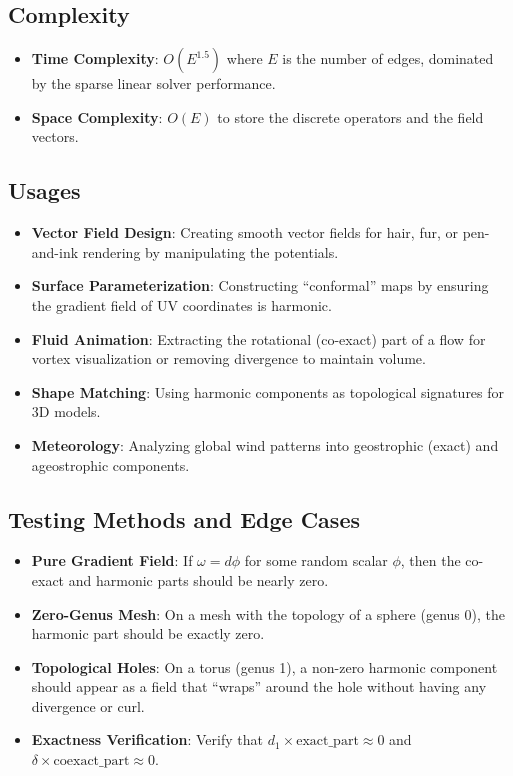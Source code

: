 \subsection{Complexity}
\begin{itemize}
    \item \textbf{Time Complexity}: $O(E^{1.5})$ where $E$ is the number of edges, dominated by the sparse linear solver performance.
    \item \textbf{Space Complexity}: $O(E)$ to store the discrete operators and the field vectors.
\end{itemize}

\subsection{Usages}
\begin{itemize}
    \item \textbf{Vector Field Design}: Creating smooth vector fields for hair, fur, or pen-and-ink rendering by manipulating the potentials.
    \item \textbf{Surface Parameterization}: Constructing ``conformal'' maps by ensuring the gradient field of UV coordinates is harmonic.
    \item \textbf{Fluid Animation}: Extracting the rotational (co-exact) part of a flow for vortex visualization or removing divergence to maintain volume.
    \item \textbf{Shape Matching}: Using harmonic components as topological signatures for 3D models.
    \item \textbf{Meteorology}: Analyzing global wind patterns into geostrophic (exact) and ageostrophic components.
\end{itemize}

\subsection{Testing Methods and Edge Cases}
\begin{itemize}
    \item \textbf{Pure Gradient Field}: If $\omega = d\phi$ for some random scalar $\phi$, then the co-exact and harmonic parts should be nearly zero.
    \item \textbf{Zero-Genus Mesh}: On a mesh with the topology of a sphere (genus 0), the harmonic part should be exactly zero.
    \item \textbf{Topological Holes}: On a torus (genus 1), a non-zero harmonic component should appear as a field that ``wraps'' around the hole without having any divergence or curl.
    \item \textbf{Exactness Verification}: Verify that $d_1 \times \text{exact\_part} \approx 0$ and $\delta \times \text{coexact\_part} \approx 0$.
\end{itemize}

